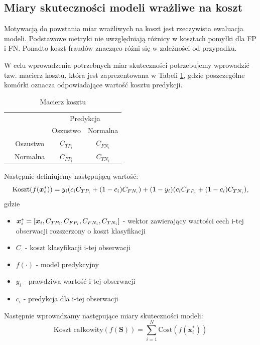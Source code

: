 \documentclass[openany]{book}
\begin{document}
	
	\subsection{Miary skuteczności modeli wrażliwe na koszt}
	
	Motywacją do powstania miar wrażliwych na koszt jest rzeczywista ewaluacja modeli. Podstawowe metryki nie uwzględniają różnicy w kosztach pomyłki dla FP i FN. Ponadto koszt fraudów znacząco różni się w zależności od przypadku.
	
	W celu wprowadzenia potrzebnych miar skuteczności potrzebujemy wprowadzić tzw. macierz kosztu, która jest zaprezentowana w Tabeli \ref{macierz-kosztu}, gdzie poszczególne komórki oznacza odpowiadające wartość kosztu predykcji. 
	\begin{table}[h]
		\begin{center}
			\makegapedcells
			\begin{tabular}{cc|cc}
				\multicolumn{2}{c}{}     &   \multicolumn{2}{c}{Predykcja} \\
				&            &   Oszustwo &   Normalna     \\ 
				\cline{2-4}
				\multirow{2}{*}{\rotatebox[origin=c]{90}{Prawda}} & Oszustwo   & $C_{TP_{i}}$         & $C_{FN_{i}}$              \\
				& Normalna   & $C_{FP_{i}}$         & $C_{TN_{i}}$              \\ 
				\cline{2-4}
			\end{tabular}
		\end{center}
		\caption{Macierz kosztu}
		\label{macierz-kosztu}
	\end{table}
	Następnie definiujemy następującą wartość:
	$$ \text{Koszt}(f(\boldsymbol{x}_{i}^{*})) = y_i (c_i C_{TP_i} + (1-c_i)C_{FN_i}) + (1-y_i)(c_i C_{FP_i} + (1-c_i)C_{TN_i}) \text{,}$$
	gdzie 
	\begin{itemize}
		\item $\boldsymbol{x}_{i}^{*} = [\boldsymbol{x}_i, C_{TP_{i}}, C_{FP_{i}}, C_{FN_{i}}, C_{TN_{i}}]$ - wektor zawierający wartości cech i-tej obserwacji rozszerzony o koszt klasyfikacji
		\item $C_{\cdot}$ - koszt klasyfikacji i-tej obserwacji
		\item $f(\cdot)$ - model predykcyjny
		\item $y_i$ - prawdziwa wartość i-tej obserwacji
		\item $c_i$ - predykcja dla i-tej obserwacji
	\end{itemize}{}
	Następnie wprowadzamy następujące miary skuteczności modeli:
	\begin{equation}
	\label{koszt-calkowity}
	\text{Koszt całkowity}(f(\boldsymbol{S})) = \sum_{i=1}^{N}\text{Cost}(f(\boldsymbol{x}_{i}^{*}))
	\end{equation} 
\end{document}
